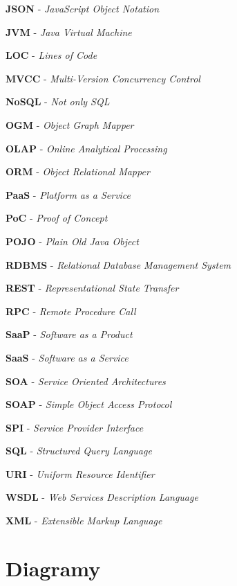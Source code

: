 \documentclass[11pt,twoside,a4paper]{book}
\begin{document}
\textbf{JSON} - \textit{JavaScript Object Notation}

\textbf{JVM} - \textit{Java Virtual Machine}

\textbf{LOC} - \textit{Lines of Code}

\textbf{MVCC} - \textit{Multi-Version Concurrency Control}

\textbf{NoSQL} - \textit{Not only SQL}

\textbf{OGM} - \textit{Object Graph Mapper}

\textbf{OLAP} - \textit{Online Analytical Processing}

\textbf{ORM} - \textit{Object Relational Mapper}

\textbf{PaaS} - \textit{Platform as a Service}

\textbf{PoC} - \textit{Proof of Concept}

\textbf{POJO} - \textit{Plain Old Java Object}

\textbf{RDBMS} - \textit{Relational Database Management System}

\textbf{REST} - \textit{Representational State Transfer}

\textbf{RPC} - \textit{Remote Procedure Call}

\textbf{SaaP} - \textit{Software as a Product}

\textbf{SaaS} - \textit{Software as a Service}

\textbf{SOA} - \textit{Service Oriented Architectures}

\textbf{SOAP} - \textit{Simple Object Access Protocol}

\textbf{SPI} - \textit{Service Provider Interface}

\textbf{SQL} - \textit{Structured Query Language}

\textbf{URI} - \textit{Uniform Resource Identifier}

\textbf{WSDL} - \textit{Web Services Description Language}

\textbf{XML} - \textit{Extensible Markup Language}


\chapter{Diagramy}
\end{document}
